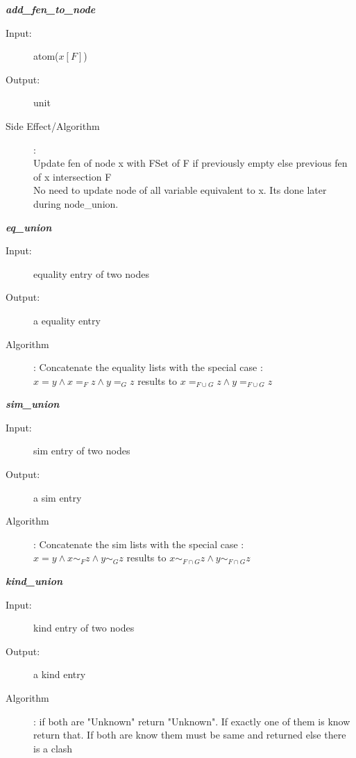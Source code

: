 \documentclass[12pt]{article}
\begin{document}
\begin{description}
\item \textbf{\textit{add\_fen\_to\_node}}
\begin{description}
    \item[Input:] atom($x[F]$)
    \item[Output:] unit
    \item[Side Effect/Algorithm]:\\Update fen of node x with FSet of F if previously empty else previous fen of x intersection F\\
    No need to update node of all variable equivalent to x. Its done later during node\_union.\\
\end{description}

\item \textbf{\textit{eq\_union}}
\begin{description}
    \item[Input:] equality entry of two nodes
    \item[Output:] a equality entry
    \item[Algorithm]: Concatenate the equality lists with the special case :\\ $x = y \wedge x =_F z\wedge y =_G z$ results to $x=_{F \cup G} z\wedge y=_{F \cup G} z$\\
\end{description}

\item \textbf{\textit{sim\_union}}
\begin{description}
    \item[Input:] sim entry of two nodes
    \item[Output:] a sim entry
    \item[Algorithm]: Concatenate the sim lists with the special case : \\$x = y \wedge  x \sim_F z \wedge y \sim_G z$ results to $x\sim_{F\cap G}z\wedge y\sim_{F \cap G} z$\\
\end{description}

\item \textbf{\textit{kind\_union}}
\begin{description}
    \item[Input:] kind entry of two nodes
    \item[Output:] a kind entry
    \item[Algorithm]: if both are "Unknown" return "Unknown". If exactly one of them is know return that. If both are know them must be same and returned else there is a clash
\end{description}


\end{description}
\end{document}
